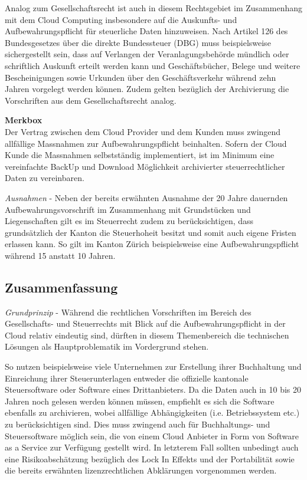 \documentclass[a4paper,pointlessnumbers]{scrreprt}
\newcommand{\merkbox}[2][0.8\textwidth]{ \begin{center} \begin{tcolorbox}[enhanced, drop fuzzy midday shadow, width={#1}, opacityframe=0.5, colframe=BrickRed, colback=white] {\ECFTeenSpirit \color{BrickRed}\textbf{Merkbox} \qquad {\tiny das gilt es zu beachten}} \\  #2 \end{tcolorbox} \end{center}}
\begin{document}
Analog zum Gesellschaftsrecht ist auch in diesem Rechtsgebiet im Zusammenhang mit dem Cloud Computing insbesondere auf die Auskunfts- und Aufbewahrungspflicht für steuerliche Daten hinzuweisen. Nach Artikel 126 des Bundesgesetzes über die direkte Bundessteuer (DBG) muss beispielsweise sichergestellt sein, dass auf Verlangen der Veranlagungsbehörde mündlich oder schriftlich Auskunft erteilt werden kann und Geschäftsbücher, Belege und weitere Bescheinigungen sowie Urkunden über den Geschäftsverkehr während zehn Jahren vorgelegt werden können. Zudem gelten bezüglich der Archivierung die Vorschriften aus dem Gesellschaftsrecht analog.

\merkbox[0.7\textwidth]{Der Vertrag zwischen dem Cloud Provider und dem Kunden muss zwingend allfällige Massnahmen zur Aufbewahrungspflicht beinhalten. Sofern der Cloud Kunde die Massnahmen selbstständig implementiert, ist im Minimum eine vereinfachte BackUp und Download Möglichkeit archivierter steuerrechtlicher Daten zu vereinbaren.}

\textit{Ausnahmen} - Neben der bereits erwähnten Ausnahme der 20 Jahre dauernden Aufbewahrungsvorschrift im Zusammenhang mit Grundstücken und Liegenschaften gilt es im Steuerrecht zudem zu berücksichtigen, dass grundsätzlich der Kanton die Steuerhoheit besitzt und somit auch eigene Fristen erlassen kann. So gilt im Kanton Zürich beispielsweise eine Aufbewahrungspflicht während 15 anstatt 10 Jahren.

\subsection{Zusammenfassung}
\textit{Grundprinzip} - Während die rechtlichen Vorschriften im Bereich des Gesellschafts- und Steuerrechts mit Blick auf die Aufbewahrungspflicht in der Cloud relativ eindeutig sind, dürften in diesem Themenbereich die technischen Lösungen als Hauptproblematik im Vordergrund stehen.

So nutzen beispielsweise viele Unternehmen zur Erstellung ihrer Buchhaltung und Einreichung ihrer Steuerunterlagen entweder die offizielle kantonale Steuersoftware oder Software eines Drittanbieters. Da die Daten auch in 10 bis 20 Jahren noch gelesen werden können müssen, empfiehlt es sich die Software ebenfalls zu archivieren, wobei allfällige Abhängigkeiten (i.e. Betriebssystem etc.) zu berücksichtigen sind. Dies muss zwingend auch für Buchhaltungs- und Steuersoftware möglich sein, die von einem Cloud Anbieter in Form von Software as a Service zur Verfügung gestellt wird. In letzterem Fall sollten unbedingt auch eine Risikoabschätzung bezüglich des Lock In Effekts und der Portabilität sowie die bereits erwähnten lizenzrechtlichen Abklärungen vorgenommen werden.
\end{document}
